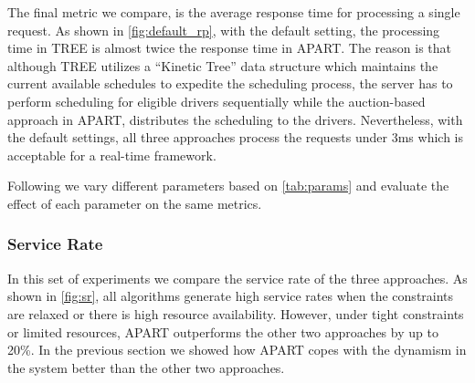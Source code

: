 The final metric we compare, is the average response time for processing a single request. As shown in \cref{fig:default_rp}, with the default setting, the processing time in TREE is almost twice the response time in APART. The reason is that although TREE utilizes a ``Kinetic Tree'' data structure which maintains the current available schedules to expedite the scheduling process, the server has to perform scheduling for eligible drivers sequentially while the auction-based approach in APART, distributes the scheduling to the drivers. Nevertheless, with the default settings, all three approaches process the requests under 3ms which is acceptable for a real-time framework.

Following we vary different parameters based on \cref{tab:params} and evaluate the effect of each parameter on the same metrics.

\subsubsection{Service Rate}
In this set of experiments we compare the service rate of the three approaches. As shown in \cref{fig:sr}, all algorithms generate high service rates when the constraints are relaxed or there is high resource availability. However, under tight constraints or limited resources, APART outperforms the other two approaches by up to 20\%. In the previous section we showed how APART copes with the dynamism in the system better than the other two approaches.

